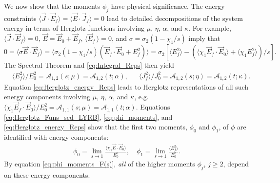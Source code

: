 \documentclass[english,12pt,jmp,graphicx]{revtex4-1}
\begin{document}
We now show that the moments $\phi_j$ have physical significance. The
energy constraints $\langle\vec{J}\cdot\vec{E}_f\rangle=\langle\vec{E}\cdot\vec{J}_f\rangle=0$ lead to
detailed decompositions of the system energy in terms of Herglotz
functions involving $\mu$, $\eta$, $\alpha$, and $\kappa$. For example,
$\langle\vec{J}\cdot\vec{E}_f\rangle=0$, $\vec{E}=\vec{E}_0+\vec{E}_f$,
$\langle\vec{E}_f\,\rangle=0$, and $\sigma=\sigma_2(1-\chi_1/s)$ imply that
$0=\langle\sigma\vec{E}\cdot\vec{E}_f\rangle=\langle\sigma_2(1-\chi_1/s)(\vec{E}_f\cdot\vec{E}_0+E_f^2)\rangle
=\sigma_2\left[\langle E_f^2\rangle- (\langle\chi_1\vec{E}_f\cdot\vec{E}_0\rangle+\langle\chi_1E_f^2\rangle)/s\right].$
The Spectral Theorem \cite{Reed-1980} and 
\eqref{eq:Integral_Reps} then yield
%
\begin{align}\label{eq:Herglotz_energy_Reps}
 &\langle E_f^2\rangle/E_0^2=\mathcal{A}_{1,2}(s;\mu)=\mathcal{A}_{1,2}(t;\alpha),
 &&\langle J_f^2\rangle/J_0^2=\mathcal{A}_{1,2}(s;\eta)=\mathcal{A}_{1,2}(t;\kappa).
\end{align}
%
Equation \eqref{eq:Herglotz_energy_Reps} leads to Herglotz
representations of all such energy components involving $\mu$,  
$\eta$, $\alpha$, and $\kappa$,
e.g. $\langle\chi_1\vec{E}_f\cdot\vec{E}_0\rangle/E_0^2=\mathcal{A}_{1,1}(s;\mu)=\mathcal{A}_{1,1}(t;\alpha)$. 
Equations \eqref{eq:Herglotz_Funs_sed_LYRB},
\eqref{eq:phi_moments}, and \eqref{eq:Herglotz_energy_Reps} show
that the first two moments, $\phi_0$ and $\phi_1$, of $\phi$ are identified
with energy components:      
%
\begin{align}\label{eq:phi_energy_relations}
  \phi_0=\lim_{s\to1}\frac{\langle\chi_1\vec{E}\cdot\vec{E}_0\rangle}{E_0^2},   \quad
  \phi_1=\lim_{s\to1}\frac{\langle E_f^2\rangle}{E_0^2}.
\end{align}
%
By equation \eqref{eq:phi_moments_F(s)}, \emph{all} of the higher
moments $\phi_j$, $j\geq2$, depend on these energy components. 
\end{document}
